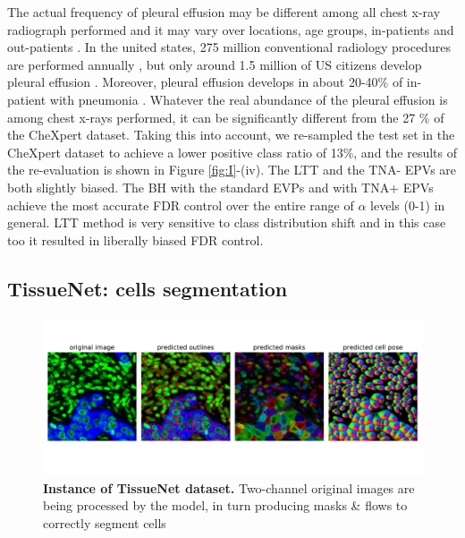 \documentclass{article}
\begin{document}
The actual frequency of pleural effusion may be different among all chest x-ray radiograph performed and it may vary over locations, age groups, in-patients and out-patients \cite{Zaki2024,Cashen2017PleuralEA}. In the united states, 275 million conventional radiology procedures are performed annually \cite{mahesh2022patient}, but only around 1.5 million of US citizens develop pleural effusion \cite{Cashen2017PleuralEA}. Moreover, pleural effusion develops in about 20-40\% of in-patient with pneumonia \cite{shebl2018parapneumonic}. Whatever the real abundance of the pleural effusion is among  chest x-rays performed, it can be significantly different from the 27 \% of the CheXpert dataset. Taking this into account, we re-sampled the test set in the CheXpert dataset to achieve a lower positive class ratio of 13\%, and the results of the re-evaluation is shown in Figure \ref{fig:I}-(iv). The LTT and the TNA- EPVs are both slightly biased. The BH with the standard EVPs and with TNA+ EPVs achieve the most accurate FDR control over the entire range of $\alpha$ levels (0-1) in general. LTT method is very sensitive to class distribution shift and in this case too it resulted in liberally biased FDR control.



\subsection{TissueNet: cells segmentation}

\begin{figure}[h!]
    \centering
	\includegraphics[width=5in]{img/tissuenet.pdf}
	\caption{{\bf Instance of TissueNet dataset.} Two-channel original images are being processed by the model, in turn producing masks \& flows to correctly segment cells}
	\label{fig:tissue_example}
\end{figure} 
\end{document}
